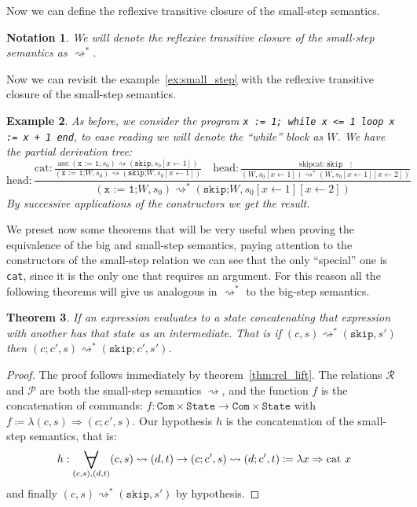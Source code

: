 \documentclass[
  a4paper, 
  10pt, 
  parskip=half, 
  DIV=20,
  toc=bibliography,
  usegeometry,
]{scrartcl}
\newtheorem{theorem}{Theorem}[section]
\newtheorem{example}[theorem]{Example}
\newtheorem{notation}[theorem]{Notation}
\newcommand{\funfont}[1]{\text{#1}}
\renewcommand{\mapsto}{\Rightarrow}
\DeclareMathOperator*{\Forall}{\scalerel*{\forall}{\sum}}
\begin{document}
Now we can define the reflexive transitive closure of the small-step semantics.

\begin{notation}
  We will denote the reflexive transitive closure of the small-step semantics as
  \(\rightsquigarrow^*\).
\end{notation}

Now we can revisit the example~\ref{ex:small_step} with the reflexive transitive
closure of the small-step semantics.

\begin{example}
  As before, we consider the program \texttt{x := 1; while x <= 1 loop x := x + 1 end},
  to ease reading we will denote the \enquote{while} block as \(W\). We have the 
  partial derivation tree:
  \[
    \funfont{head}: \frac{
      \funfont{cat}: \displaystyle{\frac{
        \funfont{ass}: (\texttt{x := 1} , s_0) \rightsquigarrow (\texttt{skip}, s_0[x \leftarrow 1])
      }
      {(\texttt{x := 1;} W, s_0)
      \rightsquigarrow
      (\texttt{skip;} W, s_0[x \leftarrow 1])
      }}
      \quad
      \funfont{head}: \displaystyle{\frac{
        \funfont{skipcat}: \texttt{skip}
        \quad
        \vdots
      }{
        (W, s_0[x \leftarrow 1]) \rightsquigarrow^* (W, s_0[x \leftarrow 1][x \leftarrow 2])
      }}
    }{
      (\texttt{x := 1;} W, s_0) \rightsquigarrow^* (\texttt{skip;} W, s_0[x \leftarrow 1][x \leftarrow 2])
    }
  \]
  By successive applications of the constructors we get the result.
\end{example}

We preset now some theorems that will be very useful when proving the equivalence of
the big and small-step semantics, paying attention to the constructors of the small-step
relation we can see that the only \enquote{special} one is \texttt{cat}, since
it is the only one that requires an argument. For this reason all the following
theorems will give us analogous in \(\rightsquigarrow^*\) to the 
big-step semantics.

\begin{theorem}
  If an expression evaluates to a state concatenating that expression with another
  has that state as an intermediate. That is if \((c, s) \rightsquigarrow^* (\texttt{skip}, s')\)
  then \((c;c', s) \rightsquigarrow^* (\texttt{skip};c', s')\).
\end{theorem}

\begin{proof}
  The proof follows immediately by theorem~\ref{thm:rel_lift}.
  The relations \(\mathcal{R}\) and \(\mathcal{P}\) are both the small-step semantics
  \(\rightsquigarrow\), and the function \(f\) is the concatenation of commands:
  \(f: \texttt{Com} \times \texttt{State} \to \texttt{Com} \times \texttt{State}\)
  with \(f \coloneqq \lambda (c, s) \mapsto (c; c', s)\). Our hypothesis \(h\)
  is the concatenation of the small-step semantics, that is:
  \[h: \Forall_{(c, s), (d, t)} (c, s) \rightsquigarrow (d, t) \to (c; c', s) \rightsquigarrow (d; c', t)
     \coloneqq \lambda x \mapsto \funfont{cat} \ x\]
  and finally \((c, s) \rightsquigarrow^* (\texttt{skip}, s')\) by hypothesis.
\end{proof}
\end{document}

